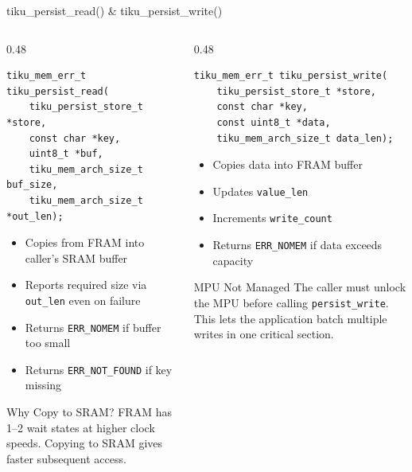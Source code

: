 \documentclass[aspectratio=169, 10pt]{beamer}
\begin{document}
\begin{frame}[fragile]{tiku\_persist\_read() \& tiku\_persist\_write()}
\begin{columns}[T]
\begin{column}{0.48\textwidth}
\begin{lstlisting}[style=cstyle, title={Read: FRAM $\rightarrow$ SRAM}]
tiku_mem_err_t tiku_persist_read(
    tiku_persist_store_t *store,
    const char *key,
    uint8_t *buf,
    tiku_mem_arch_size_t buf_size,
    tiku_mem_arch_size_t *out_len);
\end{lstlisting}

\begin{itemize}
  \item Copies from FRAM into caller's SRAM buffer
  \item Reports required size via \texttt{out\_len} even on failure
  \item Returns \texttt{ERR\_NOMEM} if buffer too small
  \item Returns \texttt{ERR\_NOT\_FOUND} if key missing
\end{itemize}

\vspace{0.3em}
\begin{block}{Why Copy to SRAM?}
FRAM has 1--2 wait states at higher clock speeds.
Copying to SRAM gives faster subsequent access.
\end{block}
\end{column}

\begin{column}{0.48\textwidth}
\begin{lstlisting}[style=cstyle, title={Write: SRAM $\rightarrow$ FRAM}]
tiku_mem_err_t tiku_persist_write(
    tiku_persist_store_t *store,
    const char *key,
    const uint8_t *data,
    tiku_mem_arch_size_t data_len);
\end{lstlisting}

\begin{itemize}
  \item Copies data into FRAM buffer
  \item Updates \texttt{value\_len}
  \item Increments \texttt{write\_count}
  \item Returns \texttt{ERR\_NOMEM} if data exceeds capacity
\end{itemize}

\vspace{0.3em}
\begin{alertblock}{MPU Not Managed}
The caller must unlock the MPU before calling
\texttt{persist\_write}. This lets the application
batch multiple writes in one critical section.
\end{alertblock}
\end{column}
\end{columns}
\end{frame}
\end{document}
